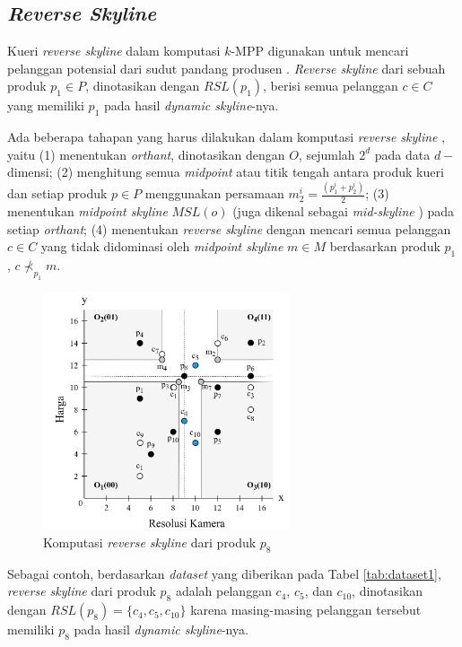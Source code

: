 \documentclass[conference]{IEEEtran}
\begin{document}
\subsection{\textit{Reverse Skyline}} \label{rsl}
Kueri \textit{reverse skyline} dalam komputasi $k$-MPP digunakan untuk mencari pelanggan potensial dari sudut pandang produsen \cite{kmpp}. \textit{Reverse skyline} \cite{reverse-skyline} dari sebuah produk $p_1 \in
P$, dinotasikan dengan $RSL(p_1)$, berisi semua pelanggan $c \in C$ yang memiliki $p_1$ pada hasil \textit{dynamic skyline}-nya.

Ada beberapa tahapan yang harus dilakukan dalam komputasi \textit{reverse skyline} \cite{kmpp}, yaitu (1) menentukan \textit{orthant}, dinotasikan dengan $O$, sejumlah $2^d$ pada data $d-$dimensi; (2) menghitung semua \textit{midpoint} atau titik tengah antara produk kueri dan setiap produk $p \in P$ menggunakan persamaan $m_2^i = \frac{(p_1^i + p_2^i)}{2}$; (3) menentukan \textit{midpoint skyline} $MSL(o)$ (juga dikenal sebagai \textit{mid-skyline} \cite{mid-skyline}) pada setiap \textit{orthant}; (4) menentukan \textit{reverse skyline} dengan mencari semua pelanggan $c \in C$ yang tidak didominasi oleh \textit{midpoint skyline} $m \in M$ berdasarkan produk $p_1$, $c \nprec_{p_1} m$.

\begin{figure}[htbp]
	\centering
	\includegraphics[height=7cm]{img/bab2/rsl.png}
	\caption{Komputasi \textit{reverse skyline} dari produk $p_8$}
	\label{fig:rsl}
\end{figure}

Sebagai contoh, berdasarkan \textit{dataset} yang diberikan pada Tabel \ref{tab:dataset1}, \textit{reverse skyline} dari produk $p_8$ adalah pelanggan $c_4$, $c_5$, dan $c_{10}$, dinotasikan dengan $RSL(p_8) = \{c_4, c_5, c_{10}\}$ karena masing-masing pelanggan tersebut memiliki $p_8$ pada hasil \textit{dynamic skyline}-nya.
\end{document}
